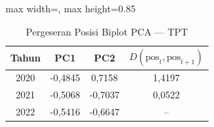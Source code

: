 \begin{table}[H]
\centering
\caption{Pergeseran Posisi Biplot PCA --- TPT} \label{tab:samplejarak_pca_loading_tpt}
\begin{adjustbox}{max width=\textwidth, max height=0.85\textheight}
\begin{tabular}{|c|c|c|c|}
\hline
\textbf{Tahun} & \textbf{PC1} & \textbf{PC2} & \textbf{$D(\text{pos}_t, \text{pos}_{t+1})$} \\
\hline
2020 & -0,4845 & 0,7158 & 1,4197 \\
2021 & -0,5068 & -0,7037 & 0,0522 \\
2022 & -0,5416 & -0,6647 & -- \\
\hline
\end{tabular}
\end{adjustbox}
\end{table}